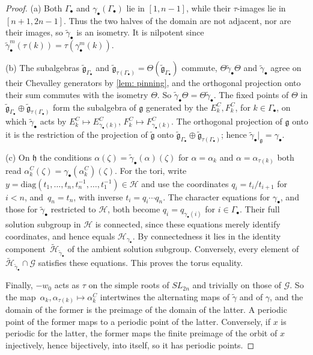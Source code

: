 \documentclass[a4paper]{amsart}
\numberwithin{equation}{section}
\theoremstyle{definition}
\theoremstyle{remark}
\newcommand{\mfh}{\mathfrak{h}}
\newcommand{\mfg}{\mathfrak{g}}
\newcommand{\mcG}{\mathcal{G}}
\newcommand{\mcH}{\mathcal{H}}
\newcommand{\tg}{\widetilde{\gamma}}
\newcommand{\Vt}{\Theta}
\newcommand{\SL}{SL_{2n}}
\begin{document}
\begin{proof}
  (a) Both $\Gamma_\bullet$ and $\gamma_\bullet(\Gamma_\bullet)$ lie in $[1,n-1]$, while their $\tau$-images lie in $[n+1,2n-1]$.
  Thus the two halves of the domain are not adjacent, nor are their images, so $\tg_\bullet$ is an isometry.
  It is nilpotent since~$\tg_\bullet^m(\tau(k))=\tau(\gamma_\bullet^m(k))$.

  (b) The subalgebras $\widetilde{\mfg}_{\Gamma_\bullet}$ and $\widetilde{\mfg}_{\tau(\Gamma_\bullet)}=\Vt(\widetilde{\mfg}_{\Gamma_\bullet})$ commute, $\Vt\tg_\bullet\Vt$ and $\tg_\bullet$ agree on their Chevalley generators by \cref{lem: pinning}, and the orthogonal projection onto their sum commutes with the isometry $\Vt$.
  So $\tg_\bullet\Vt=\Vt\tg_\bullet$.
  The fixed points of $\Vt$ in $\widetilde{\mfg}_{\Gamma_\bullet}\oplus\widetilde{\mfg}_{\tau(\Gamma_\bullet)}$ form the subalgebra of $\mfg$ generated by the $E^C_k,F^C_k$, for $k\in\Gamma_\bullet$, on which $\tg_\bullet$ acts by $E^C_k\mapsto E^C_{\gamma_\bullet(k)}$, $F^C_k\mapsto F^C_{\gamma_\bullet(k)}$.
  The orthogonal projection of $\mfg$ onto it is the restriction of the projection of $\widetilde{\mfg}$ onto $\widetilde{\mfg}_{\Gamma_\bullet}\oplus\widetilde{\mfg}_{\tau(\Gamma_\bullet)}$; hence $\tg_\bullet|_\mfg=\gamma_\bullet$.

  (c) On $\mfh$ the conditions $\alpha(\zeta)=\tg_\bullet(\alpha)(\zeta)$ for $\alpha=\alpha_k$ and $\alpha=\alpha_{\tau(k)}$ both read $\alpha^C_k(\zeta)=\gamma_\bullet(\alpha^C_k)(\zeta)$.
  For the tori, write $y=\mathrm{diag}(t_1,\dots,t_n,t_n^{-1},\dots,t_1^{-1})\in\mcH$ and use the coordinates $q_i=t_i/t_{i+1}$ for $i<n$, and~$q_n=t_n$, with inverse $t_i=q_i\cdots q_n$.
  The character equations for $\gamma_\bullet$, and those for $\tg_\bullet$ restricted to $\mcH$, both become $q_i=q_{\gamma_\bullet(i)}$ for $i\in\Gamma_\bullet$.
  Their full solution subgroup in $\mcH$ is connected, since these equations merely identify coordinates, and hence equals $\mcH_{\gamma_\bullet}$.
  By connectedness it lies in the identity component~$\widetilde{\mcH}_{\tg_\bullet}$ of the ambient solution subgroup.
  Conversely, every element of $\widetilde{\mcH}_{\tg_\bullet}\cap\mcG$ satisfies these equations.
  This proves the torus equality.

  Finally, $-w_0$ acts as $\tau$ on the simple roots of $\SL$ and trivially on those of $\mcG$.
  So the map~${\alpha_k,\alpha_{\tau(k)}\mapsto\alpha^C_k}$ intertwines the alternating maps of $\tg$ and of $\gamma$, and the domain of the former is the preimage of the domain of the latter.
  A periodic point of the former maps to a periodic point of the latter.
  Conversely, if $x$ is periodic for the latter, the former maps the finite preimage of the orbit of $x$ injectively, hence bijectively, into itself, so it has periodic points.
\end{proof}
\end{document}
